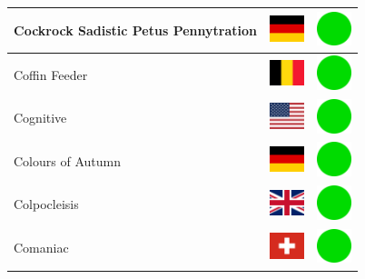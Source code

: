\documentclass[12pt, a4paper, twoside]{report}
\begin{document}
\begin{center}
\begin{longtable}{|p{5cm}|p{2cm}|p{2cm}|}
 Cockrock Sadistic Petus Pennytration                       & \includegraphics[width=1cm]{../img/flags/de} &   \includegraphics[width=1cm]{../likes/y} \\ \hline
 Coffin Feeder                                              & \includegraphics[width=1cm]{../img/flags/be} &   \includegraphics[width=1cm]{../likes/y} \\ \hline
 Cognitive                                                  & \includegraphics[width=1cm]{../img/flags/us} &   \includegraphics[width=1cm]{../likes/y} \\ \hline
 Colours of Autumn                                          & \includegraphics[width=1cm]{../img/flags/de} &   \includegraphics[width=1cm]{../likes/y} \\ \hline
 Colpocleisis                                               & \includegraphics[width=1cm]{../img/flags/gb} &   \includegraphics[width=1cm]{../likes/y} \\ \hline
 Comaniac                                                   & \includegraphics[width=1cm]{../img/flags/ch} &   \includegraphics[width=1cm]{../likes/y} \\ \hline

\end{longtable}
\end{center}
\end{document}
